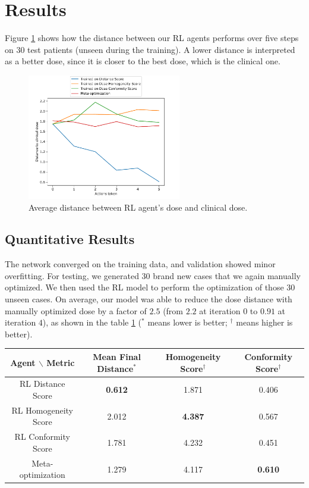 \section{Results}
Figure \ref{fig:distance} shows how the distance between our RL agents performs over five steps on 30 test patients (unseen during the training).
A lower distance is interpreted as a better dose, since it is closer to the best dose, which is the clinical one.
\begin{figure}
	\centering
	\includegraphics[width=0.6\textwidth]{DistanceToClinicalDose.pdf}
	\caption{Average distance between RL agent's dose and clinical dose.}
	\label{fig:distance}
\end{figure}


\subsection{Quantitative Results}
The network converged on the training data, and validation showed minor overfitting.
For testing, we generated 30 brand new cases that we again manually optimized.
We then used the RL model to perform the optimization of those 30 unseen cases.
On average, our model was able to reduce the dose distance with manually optimized dose by a factor of $2.5$ (from $2.2$ at iteration $0$ to $0.91$ at iteration $4$), as shown in the table \ref{table:results} ($^*$ means lower is better; $^\dagger$ means higher is better).

\begin{table}
	\begin{center}
		\begin{tabular}{| c || c | c | c |} 
			\hline
			Agent $\backslash$ Metric & Mean Final Distance$^*$ & Homogeneity Score$^\dagger$ & Conformity Score$^\dagger$ \\ 
			\hline
			RL Distance Score & \textbf{0.612} & 1.871 & 0.406 \\ 
			RL Homogeneity Score & 2.012 & \textbf{4.387} & 0.567 \\
			RL Conformity Score &  1.781  & 4.232 & 0.451 \\
			Meta-optimization & 1.279 & 4.117 & \textbf{0.610} \\
			\hline
		\end{tabular}
		\label{table:results}
	\end{center}
\end{table}

